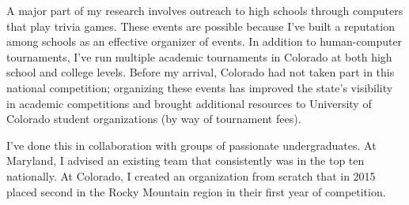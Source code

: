 \documentclass[11pt]{amsart}
\begin{document}
A major part of my research involves outreach to high schools through computers
that play trivia games.  These events are possible because I've built a
reputation among schools as an effective organizer of events.  In addition to
human-computer tournaments, I've run multiple academic tournaments in Colorado
at both high school and college levels.  Before my arrival, Colorado had not
taken part in this national competition; organizing these events has improved
the state's visibility in academic competitions and brought additional resources
to University of Colorado student organizations (by way of tournament fees).

I've done this in collaboration with groups of passionate undergraduates.  At
Maryland, I advised an existing team that consistently was in the top ten
nationally.  At Colorado, I created an organization from scratch that in 2015
placed second in the Rocky Mountain region in their first year of competition.


%
%
\end{document}
